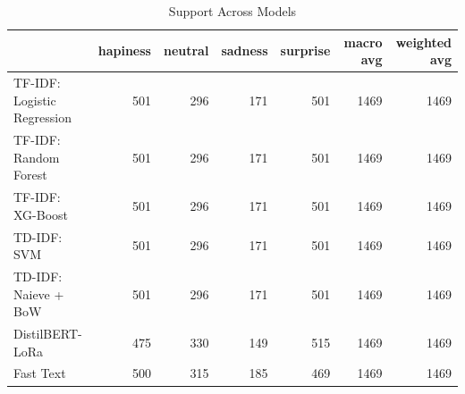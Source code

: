 \begin{table}
\caption{Support Across Models}
\begin{tabular}{lrrrrrr}
\toprule
 & hapiness & neutral & sadness & surprise & macro avg & weighted avg \\
\midrule
TF-IDF: Logistic Regression & 501 & 296 & 171 & 501 & 1469 & 1469 \\
TF-IDF: Random Forest & 501 & 296 & 171 & 501 & 1469 & 1469 \\
TF-IDF: XG-Boost & 501 & 296 & 171 & 501 & 1469 & 1469 \\
TD-IDF: SVM & 501 & 296 & 171 & 501 & 1469 & 1469 \\
TD-IDF: Naieve + BoW & 501 & 296 & 171 & 501 & 1469 & 1469 \\
DistilBERT-LoRa & 475 & 330 & 149 & 515 & 1469 & 1469 \\
Fast Text & 500 & 315 & 185 & 469 & 1469 & 1469 \\
\bottomrule
\end{tabular}
\end{table}
